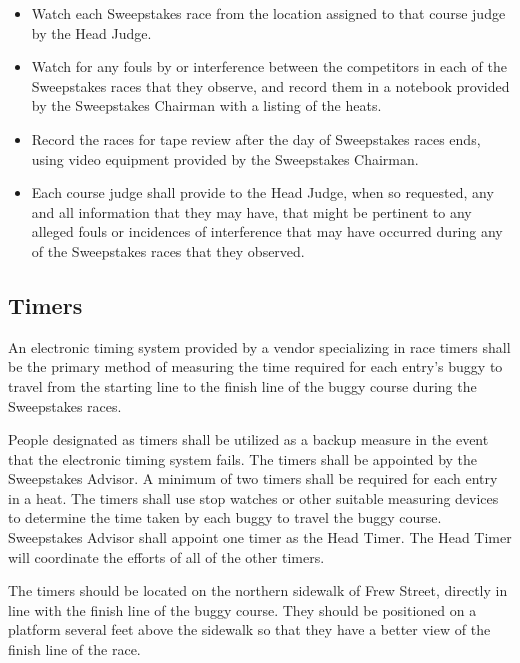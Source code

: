 	\begin{itemize}

		\item Watch each Sweepstakes race from the location assigned to that course judge by the Head Judge.

		\item Watch for any fouls by or interference between the competitors in each of the Sweepstakes races that they observe, and record them in a notebook provided by the Sweepstakes Chairman with a listing of the heats.

		\item Record the races for tape review after the day of Sweepstakes races ends, using video equipment provided by the Sweepstakes Chairman.

		\item Each course judge shall provide to the Head Judge, when so requested, any and all information that they may have, that might be pertinent to any alleged fouls or incidences of interference that may have occurred during any of the Sweepstakes races that they observed.

	\end{itemize}

\subsection{Timers}

	An electronic timing system provided by a vendor specializing in race timers shall be the primary method of measuring the time required for each entry's buggy to travel from the starting line to the finish line of the buggy course during the Sweepstakes races. 

	People designated as timers shall be utilized as a backup measure in the event that the electronic timing system fails. The timers shall be appointed by the Sweepstakes Advisor. A minimum of two timers shall be required for each entry in a heat. The timers shall use stop watches or other suitable measuring devices to determine the time taken by each buggy to travel the buggy course. Sweepstakes Advisor shall appoint one timer as the Head Timer. The Head Timer will coordinate the efforts of all of the other timers.

	The timers should be located on the northern sidewalk of Frew Street, directly in line with the finish line of the buggy course. They should be positioned on a platform several feet above the sidewalk so that they have a better view of the finish line of the race.

